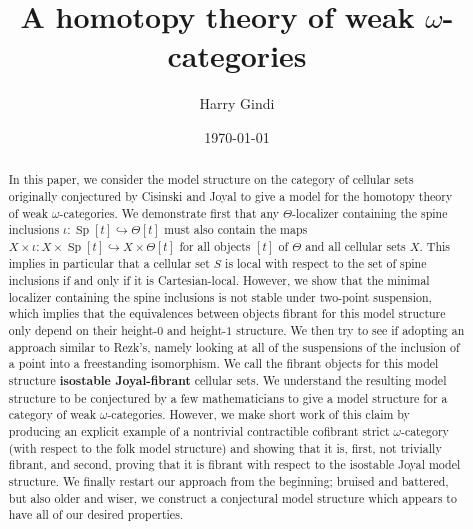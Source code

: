 \documentclass{amsbook}
\theoremstyle{plain}   %
\theoremstyle{remark}
\theoremstyle{plain}
\newcommand{\Sp}{{\operatorname{Sp}}}
\newcommand{\dfn}{\textbf}
\numberwithin{section}{chapter}
\begin{document}
\frontmatter
\title[A theory of weak $\omega$-categories]{A homotopy theory of weak $\omega$-categories}
\author[H. Gindi]{Harry Gindi}
\date{\today}
\begin{abstract} In this paper, we consider the model structure on the category of cellular sets originally conjectured by Cisinski and Joyal to give a model for the homotopy theory of weak \(\omega\)-categories.  We demonstrate first that any \(\Theta\)-localizer containing the spine inclusions \(\iota: \Sp[t] \hookrightarrow \Theta[t]\) must also contain the maps \(X\times \iota: X\times \Sp[t] \hookrightarrow X\times \Theta[t]\) for all objects \([t]\) of \(\Theta\)  and all cellular sets \(X\).  This implies in particular that a cellular set \(S\) is local with respect to the set of spine inclusions if and only if it is Cartesian-local.  However, we show that the minimal localizer containing the spine inclusions is not stable under two-point suspension, which implies that the equivalences between objects fibrant for this model structure only depend on their height-\(0\) and height-\(1\) structure.  We then try to see if adopting an approach similar to Rezk's, namely looking at all of the suspensions of the inclusion of a point into a freestanding isomorphism. We call the fibrant objects for this model structure \dfn{isostable Joyal-fibrant} cellular sets.  We understand the resulting model structure to be conjectured by a few mathematicians to give a model structure for a category of weak \(\omega\)-categories.  However, we make short work of this claim by producing an explicit example of a nontrivial contractible cofibrant strict \(\omega\)-category (with respect to the folk model structure) and showing that it is, first, not trivially fibrant, and second, proving that it is fibrant with respect to the isostable Joyal model structure.  We finally restart our approach from the beginning; bruised and battered, but also older and wiser, we construct a conjectural model structure which appears to have all of our desired properties.  
\end{abstract}

\maketitle

\tableofcontents
\end{document}
